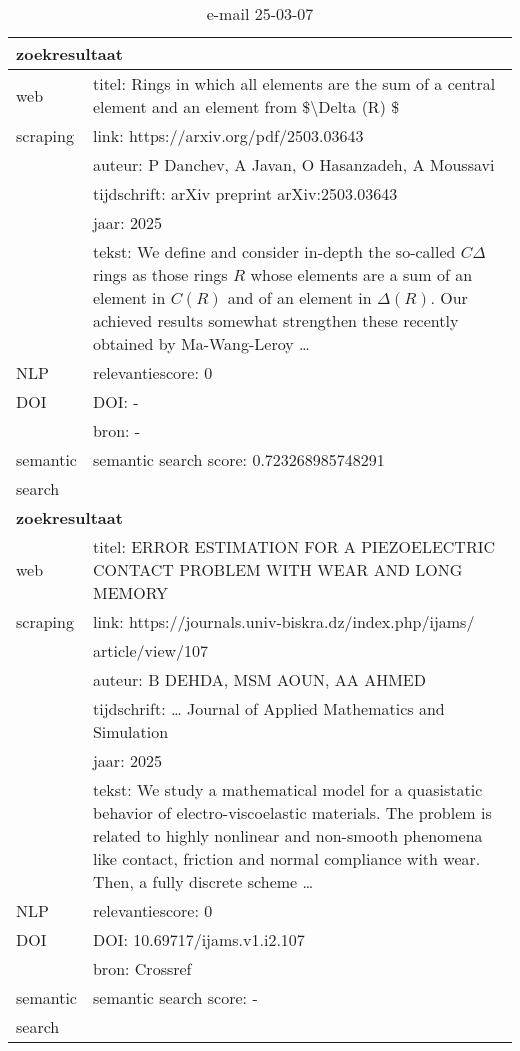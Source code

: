 \begin{table}[h!]
    \caption{e-mail 25-03-07}
    \centering
    \begin{tabularx}{\textwidth}{|p{4cm}|X|} 
        \hline
        \multicolumn{2}{|X|}{\textbf{zoekresultaat}} \\
        \hline
        web &titel: Rings in which all elements are the sum of a central element and an element from \$\textbackslash Delta (R) \$\\
        scraping&link: https://arxiv.org/pdf/2503.03643\\
        &auteur: P Danchev, A Javan, O Hasanzadeh, A Moussavi\\
        &tijdschrift: arXiv preprint arXiv:2503.03643\\
        &jaar: 2025\\
        &tekst: We define and consider in-depth the so-called $C\Delta$ rings as those rings $R$ whose elements are a sum of an element in $C(R)$ and of an element in $\Delta(R)$. Our achieved results somewhat strengthen these recently obtained by Ma-Wang-Leroy …\\
        \hline
        NLP&relevantiescore: 0\\
        \hline
        DOI&DOI: -\\
        &bron: -\\
        \hline
        semantic&semantic search score: 0.723268985748291\\
        search&\\
        \hline
        \multicolumn{2}{|X|}{\textbf{zoekresultaat}} \\
        \hline
        web &titel: ERROR ESTIMATION FOR A PIEZOELECTRIC CONTACT PROBLEM WITH WEAR AND LONG MEMORY\\
        scraping&link: https://journals.univ-biskra.dz/index.php/ijams/\\&article/view/107\\
        &auteur: B DEHDA, MSM AOUN, AA AHMED\\
        &tijdschrift: … Journal of Applied Mathematics and Simulation\\
        &jaar: 2025\\
        &tekst: We study a mathematical model for a quasistatic behavior of electro-viscoelastic materials. The problem is related to highly nonlinear and non-smooth phenomena like contact, friction and normal compliance with wear. Then, a fully discrete scheme …\\
        \hline
        NLP&relevantiescore: 0\\
        \hline
        DOI&DOI: 10.69717/ijams.v1.i2.107\\
        &bron: Crossref\\
        \hline
        semantic&semantic search score: -\\
        search&\\
        \hline
    \end{tabularx}
    \label{table:email20250307}
\end{table}
